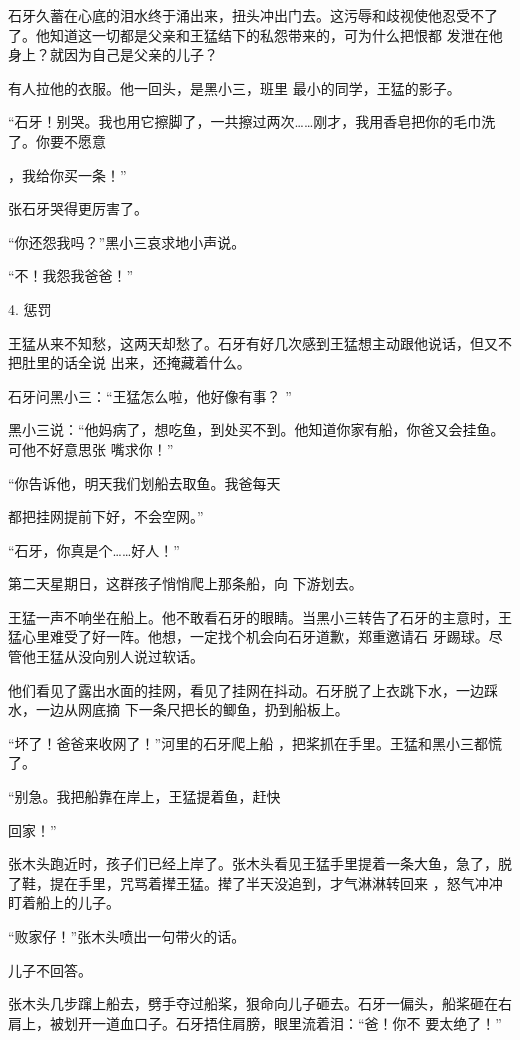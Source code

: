\documentclass{article}
\begin{document}
石牙久蓄在心底的泪水终于涌出来，扭头冲出门去。这污辱和歧视使他忍受不了了。他知道这一切都是父亲和王猛结下的私怨带来的，可为什么把恨都
发泄在他身上？就因为自己是父亲的儿子？ 

有人拉他的衣服。他一回头，是黑小三，班里
最小的同学，王猛的影子。 

“石牙！别哭。我也用它擦脚了，一共擦过两次……刚才，我用香皂把你的毛巾洗了。你要不愿意

\newpage
，我给你买一条！” 


张石牙哭得更厉害了。 


“你还怨我吗？”黑小三哀求地小声说。 


“不！我怨我爸爸！” 


4. 惩罚 

王猛从来不知愁，这两天却愁了。石牙有好几次感到王猛想主动跟他说话，但又不把肚里的话全说
出来，还掩藏着什么。 

石牙问黑小三：“王猛怎么啦，他好像有事？
” 

黑小三说：“他妈病了，想吃鱼，到处买不到。他知道你家有船，你爸又会挂鱼。可他不好意思张
嘴求你！” 

“你告诉他，明天我们划船去取鱼。我爸每天
\newpage

都把挂网提前下好，不会空网。” 


“石牙，你真是个……好人！” 

第二天星期日，这群孩子悄悄爬上那条船，向
下游划去。 

王猛一声不响坐在船上。他不敢看石牙的眼睛。当黑小三转告了石牙的主意时，王猛心里难受了好一阵。他想，一定找个机会向石牙道歉，郑重邀请石
牙踢球。尽管他王猛从没向别人说过软话。 

他们看见了露出水面的挂网，看见了挂网在抖动。石牙脱了上衣跳下水，一边踩水，一边从网底摘
下一条尺把长的鲫鱼，扔到船板上。 

“坏了！爸爸来收网了！”河里的石牙爬上船
，把桨抓在手里。王猛和黑小三都慌了。 

“别急。我把船靠在岸上，王猛提着鱼，赶快

\newpage
回家！” 

张木头跑近时，孩子们已经上岸了。张木头看见王猛手里提着一条大鱼，急了，脱了鞋，提在手里，咒骂着撵王猛。撵了半天没追到，才气淋淋转回来
，怒气冲冲盯着船上的儿子。 


“败家仔！”张木头喷出一句带火的话。 


儿子不回答。 

张木头几步蹿上船去，劈手夺过船桨，狠命向儿子砸去。石牙一偏头，船桨砸在右肩上，被划开一道血口子。石牙捂住肩膀，眼里流着泪：“爸！你不
要太绝了！” 
\end{document}

